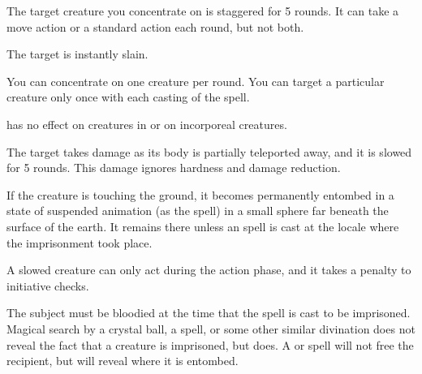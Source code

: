 \spellrng{\rngclose}
\begin{spellhealthy}
  The target creature you concentrate on is staggered for 5 rounds. It can take a move action or a standard action each round, but not both.
\end{spellhealthy}
\begin{spellblood}
  The target is instantly slain.
\end{spellblood}
\begin{spellnotes}
  You can concentrate on one creature per round. You can target a particular creature only once with each casting of the spell.
  \par {} has no effect on creatures in  or on incorporeal creatures.
\end{spellnotes}

\spellrng{\rngclose}
\begin{spelleffect}
  The target takes damage as its body is partially teleported away, and it is slowed for 5 rounds. This damage ignores hardness and damage reduction.
\end{spelleffect}
\begin{spellblood}
  If the creature is touching the ground, it becomes permanently entombed in a state of suspended animation (as the  spell) in a small sphere far beneath the surface of the earth. It remains there unless an  spell is cast at the locale where the imprisonment took place.
\end{spellblood}
\begin{spellnotes}
   A slowed creature can only act during the action phase, and it takes a  penalty to initiative checks.

  The subject must be bloodied at the time that the spell is cast to be imprisoned. Magical search by a crystal ball, a  spell, or some other similar divination does not reveal the fact that a creature is imprisoned, but  does. A  or  spell will not free the recipient, but will reveal where it is entombed.
\end{spellnotes}


